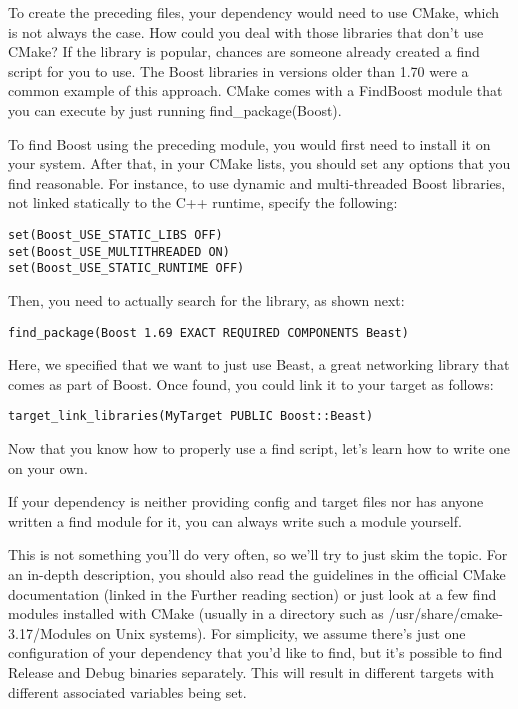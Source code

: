 To create the preceding files, your dependency would need to use CMake, which is not always the case. How could you deal with those libraries that don't use CMake? If the library is popular, chances are someone already created a find script for you to use. The Boost libraries in versions older than 1.70 were a common example of this approach. CMake comes with a FindBoost module that you can execute by just running find\_package(Boost).

To find Boost using the preceding module, you would first need to install it on your system. After that, in your CMake lists, you should set any options that you find reasonable. For instance, to use dynamic and multi-threaded Boost libraries, not linked statically to the C++ runtime, specify the following:

\begin{lstlisting}[style=styleCMake]
set(Boost_USE_STATIC_LIBS OFF)
set(Boost_USE_MULTITHREADED ON)
set(Boost_USE_STATIC_RUNTIME OFF)
\end{lstlisting}

Then, you need to actually search for the library, as shown next:

\begin{lstlisting}[style=styleCMake]
find_package(Boost 1.69 EXACT REQUIRED COMPONENTS Beast)
\end{lstlisting}

Here, we specified that we want to just use Beast, a great networking library that comes as part of Boost. Once found, you could link it to your target as follows:

\begin{lstlisting}[style=styleCMake]
target_link_libraries(MyTarget PUBLIC Boost::Beast)
\end{lstlisting}

Now that you know how to properly use a find script, let's learn how to write one on your own.


If your dependency is neither providing config and target files nor has anyone written a find module for it, you can always write such a module yourself.

This is not something you'll do very often, so we'll try to just skim the topic. For an in-depth description, you should also read the guidelines in the official CMake documentation (linked in the Further reading section) or just look at a few find modules installed with CMake (usually in a directory such as /usr/share/cmake-3.17/Modules on Unix systems). For simplicity, we assume there's just one configuration of your dependency that you'd like to find, but it's possible to find Release and Debug binaries separately. This will result in different targets with different associated variables being set.

